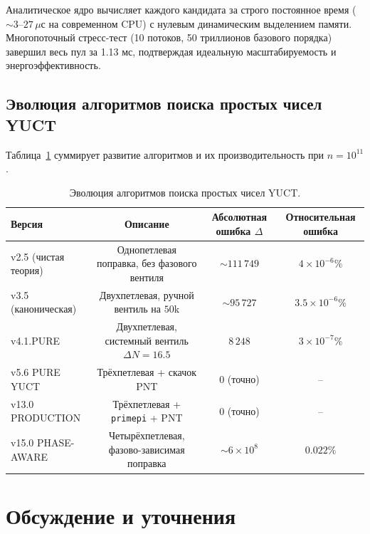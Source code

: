 \documentclass[12pt,a4paper]{article}
\begin{document}
	Аналитическое ядро вычисляет каждого кандидата за строго постоянное время (\(\sim 3\)--\(27\,\mu\text{с}\) на современном CPU) с нулевым динамическим выделением памяти. Многопоточный стресс-тест (10 потоков, 50 триллионов базового порядка) завершил весь пул за 1.13 мс, подтверждая идеальную масштабируемость и энергоэффективность.
	
	\subsection{Эволюция алгоритмов поиска простых чисел YUCT}
	Таблица~\ref{tab:all-versions} суммирует развитие алгоритмов и их производительность при \(n=10^{11}\).
	
	\begin{table}[htbp]
		\centering
		\scriptsize
		\caption{Эволюция алгоритмов поиска простых чисел YUCT.}
		\label{tab:all-versions}
		\begin{tabular}{l c c c}
			\toprule
			Версия & Описание & Абсолютная ошибка \(\Delta\) & Относительная ошибка \\
			\midrule
			v2.5 (чистая теория)  & Однопетлевая поправка, без фазового вентиля & \(\sim 111\,749\) & \(4\times10^{-6}\%\) \\
			v3.5 (каноническая)   & Двухпетлевая, ручной вентиль на \(50\)k & \(\sim 95\,727\) & \(3.5\times10^{-6}\%\) \\
			v4.1.PURE             & Двухпетлевая, системный вентиль \(\Delta N=16.5\) & \(8\,248\) & \(3\times10^{-7}\%\) \\
			v5.6 PURE YUCT        & Трёхпетлевая + скачок PNT & 0 (точно) & -- \\
			v13.0 PRODUCTION      & Трёхпетлевая + \texttt{primepi} + PNT & 0 (точно) & -- \\
			v15.0 PHASE-AWARE     & Четырёхпетлевая, фазово-зависимая поправка & \(\sim 6\times10^{8}\) & \(0.022\%\) \\
			\bottomrule
		\end{tabular}
	\end{table}
	
	\section{Обсуждение и уточнения}
	\label{sec:discussion}
	
\end{document}
